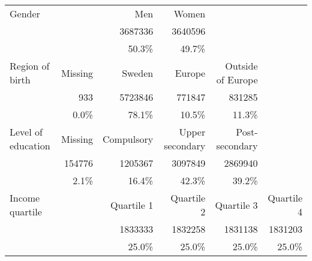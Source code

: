 \begin{tabular}{@{}l*{5}{r}@{}}
\toprule
Gender             &              & {Men}         & {Women}           &                     &              \tabularnewline
                   &              & \num{3687336} & \num{3640596}     &                     &              \tabularnewline
                   &              & 50.3\%        & 49.7\%            &                     &              \tabularnewline
\midrule
Region of birth    & {Missing}             & {Sweden}      & {Europe}          & {Outside of Europe} &              \tabularnewline
                   & \num{933}    & \num{5723846} & \num{771847}      & \num{831285}        &              \tabularnewline
                   & 0.0\%        & 78.1\%        & 10.5\%            & 11.3\%              &              \tabularnewline
\midrule
Level of education & {Missing}              & {Compulsory}  & {Upper secondary} & {Post-secondary}    &              \tabularnewline
                   & \num{154776} & \num{1205367} & \num{3097849}     & \num{2869940}       &              \tabularnewline
                   & 2.1\%        & 16.4\%        & 42.3\%            & 39.2\%              &              \tabularnewline
\midrule
Income quartile    &              & {Quartile 1}  & {Quartile 2}      & {Quartile 3}        & {Quartile 4} \tabularnewline
                   &              & \num{1833333} & \num{1832258}     & \num{1831138}       & \num{1831203}\tabularnewline
                   &              & 25.0\%        & 25.0\%            & 25.0\%              & 25.0\%       \tabularnewline
\bottomrule
\end{tabular}